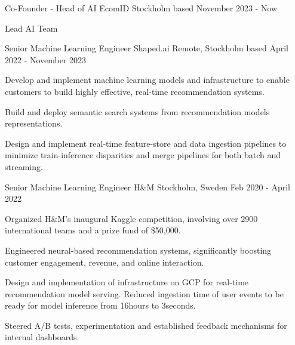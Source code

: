 

\begin{cventries}

\cventry
    {Co-Founder - Head of AI} %
    {EcomID} %
    {Stockholm based} %
    {November 2023 - Now} %
    {
        \begin{cvitems} %
        \item {Lead AI Team}
      \end{cvitems}
    }
\cventry
    {Senior Machine Learning Engineer} %
    {Shaped.ai} %
    {Remote, Stockholm based} %
    {April 2022 - November 2023} %
    {
        \begin{cvitems} %
        \item {Develop and implement machine learning models and
infrastructure to enable customers to build highly effective,
real-time recommendation systems.}
        \item {Build and deploy semantic search systems from recommendation models representations.}
        \item {Design and implement real-time feature-store and data ingestion pipelines to minimize train-inference disparities and merge pipelines for both batch and streaming.}
      \end{cvitems}
    }
\cventry
    {Senior Machine Learning Engineer}
    {H\&M}
    {Stockholm, Sweden}
    {Feb 2020 - April 2022}
    {
      \begin{cvitems} %
        \item {Organized H\&M's inaugural Kaggle competition, involving over 2900 international teams and a prize fund of \$50,000.}
        \item {Engineered neural-based recommendation systems, significantly boosting customer engagement, revenue, and online interaction.}
        \item {Design and implementation of infrastructure on GCP for real-time recommendation model serving. Reduced ingestion time of user events to be ready for model inference from 16hours to 3seconds.}
        \item {Steered A/B tests, experimentation and established feedback mechanisms for internal dashboards.}
      \end{cvitems}
    }



\end{cventries}
